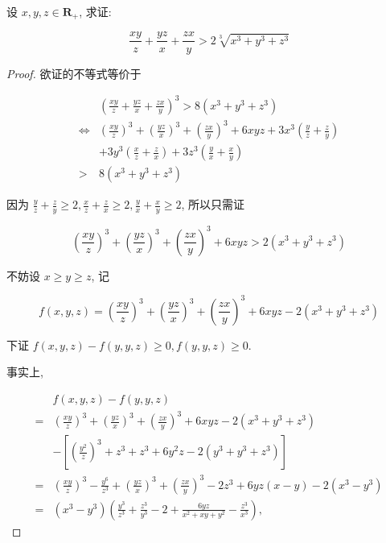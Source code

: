\begin{example}
	设 $x, y, z \in \mathbf{R}_{+}$, 求证:
	
	$$
	\frac{x y}{z}+\frac{y z}{x}+\frac{z x}{y}>2 \sqrt[3]{x^{3}+y^{3}+z^{3}}
	$$
\end{example}
\begin{proof}
	欲证的不等式等价于
	
	$$
	\begin{aligned}
	& \left(\frac{x y}{z}+\frac{y z}{x}+\frac{z x}{y}\right)^{3}>8\left(x^{3}+y^{3}+z^{3}\right) \\
	\Leftrightarrow & \left(\frac{x y}{z}\right)^{3}+\left(\frac{y z}{x}\right)^{3}+\left(\frac{z x}{y}\right)^{3}+6 x y z+3 x^{3}\left(\frac{y}{z}+\frac{z}{y}\right) \\
	& +3 y^{3}\left(\frac{x}{z}+\frac{z}{x}\right)+3 z^{3}\left(\frac{y}{x}+\frac{x}{y}\right) \\
	> & 8\left(x^{3}+y^{3}+z^{3}\right)
	\end{aligned}
	$$
	
	因为 $\frac{y}{z}+\frac{z}{y} \geqslant 2, \frac{x}{z}+\frac{z}{x} \geqslant 2, \frac{y}{x}+\frac{x}{y} \geqslant 2$, 所以只需证
	
	
	\begin{equation*}
	\left(\frac{x y}{z}\right)^{3}+\left(\frac{y z}{x}\right)^{3}+\left(\frac{z x}{y}\right)^{3}+6 x y z>2\left(x^{3}+y^{3}+z^{3}\right) \tag{1}
	\end{equation*}
	
	
	不妨设 $x \geqslant y \geqslant z$, 记
	
	$$
	f(x, y, z)=\left(\frac{x y}{z}\right)^{3}+\left(\frac{y z}{x}\right)^{3}+\left(\frac{z x}{y}\right)^{3}+6 x y z-2\left(x^{3}+y^{3}+z^{3}\right)
	$$
	
	下证 $f(x, y, z)-f(y, y, z) \geqslant 0, f(y, y, z) \geqslant 0$.
	
	事实上,
	
	$$
	\begin{aligned}
	& f(x, y, z)-f(y, y, z) \\
	= & \left(\frac{x y}{z}\right)^{3}+\left(\frac{y z}{x}\right)^{3}+\left(\frac{z x}{y}\right)^{3}+6 x y z-2\left(x^{3}+y^{3}+z^{3}\right) \\
	& -\left[\left(\frac{y^{2}}{z}\right)^{3}+z^{3}+z^{3}+6 y^{2} z-2\left(y^{3}+y^{3}+z^{3}\right)\right] \\
	= & \left(\frac{x y}{z}\right)^{3}-\frac{y^{6}}{z^{3}}+\left(\frac{y z}{x}\right)^{3}+\left(\frac{z x}{y}\right)^{3}-2 z^{3}+6 y z(x-y)-2\left(x^{3}-y^{3}\right) \\
	= & \left(x^{3}-y^{3}\right)\left(\frac{y^{3}}{z^{3}}+\frac{z^{3}}{y^{3}}-2+\frac{6 y z}{x^{2}+x y+y^{2}}-\frac{z^{3}}{x^{3}}\right),
	\end{aligned}
	$$
	

\end{proof}
